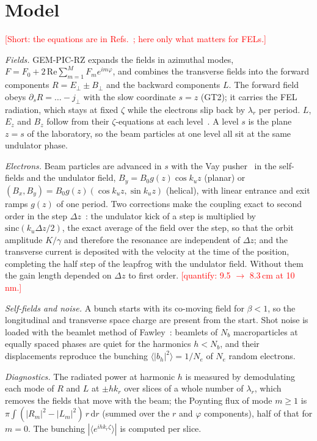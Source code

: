 \documentclass[aps,prab,reprint,floatfix,superscriptaddress,amsmath,amssymb]{revtex4-2}
\newcommand{\dd}{\mathrm{d}}
\newcommand{\todo}[1]{\textcolor{red}{[#1]}}
\begin{document}
\section{Model}\label{sec:model}

\todo{Short: the equations are in Refs.~\cite{GEMPIC,GEMPICRZ_paper}; here only what matters for FELs.}

\emph{Fields.} GEM-PIC-RZ expands the fields in azimuthal modes, $F = F_0 + 2\,\mathrm{Re}\sum_{m=1}^{M} F_m e^{im\varphi}$, and combines the transverse fields into the forward components $R = E_\perp \pm B_\perp$ and the backward components $L$. The forward field obeys $\partial_s R = \ldots - j_\perp$ with the slow coordinate $s = z$ (GT2); it carries the FEL radiation, which stays at fixed $\zeta$ while the electrons slip back by $\lambda_r$ per period. $L$, $E_z$ and $B_z$ follow from their $\zeta$-equations at each level~\cite{GEMPICRZ_paper}. A level $s$ is the plane $z = s$ of the laboratory, so the beam particles at one level all sit at the same undulator phase.

\emph{Electrons.} Beam particles are advanced in $s$ with the Vay pusher~\cite{Vay2008} in the self-fields and the undulator field, $B_y = B_0 g(z)\cos k_u z$ (planar) or $(B_x, B_y) = B_0 g(z)(\cos k_u z, \sin k_u z)$ (helical), with linear entrance and exit ramps $g(z)$ of one period. Two corrections make the coupling exact to second order in the step $\Delta z$~\cite{GEMPICRZ}: the undulator kick of a step is multiplied by $\mathrm{sinc}(k_u\Delta z/2)$, the exact average of the field over the step, so that the orbit amplitude $K/\gamma$ and therefore the resonance are independent of $\Delta z$; and the transverse current is deposited with the velocity at the time of the position, completing the half step of the leapfrog with the undulator field. Without them the gain length depended on $\Delta z$ to first order. \todo{quantify: 9.5 $\to$ 8.3\,cm at 10\,nm.}

\emph{Self-fields and noise.} A bunch starts with its co-moving field for $\beta < 1$, so the longitudinal and transverse space charge are present from the start. Shot noise is loaded with the beamlet method of Fawley~\cite{Fawley2002}: beamlets of $N_b$ macroparticles at equally spaced phases are quiet for the harmonics $h < N_b$, and their displacements reproduce the bunching $\langle|b_h|^2\rangle = 1/N_e$ of $N_e$ random electrons.

\emph{Diagnostics.} The radiated power at harmonic $h$ is measured by demodulating each mode of $R$ and $L$ at $\pm h k_r$ over slices of a whole number of $\lambda_r$, which removes the fields that move with the beam; the Poynting flux of mode $m \ge 1$ is $\pi\int(|R_m|^2 - |L_m|^2)\,r\,\dd r$ (summed over the $r$ and $\varphi$ components), half of that for $m = 0$. The bunching $|\langle e^{ihk_r\zeta}\rangle|$ is computed per slice.
\end{document}
